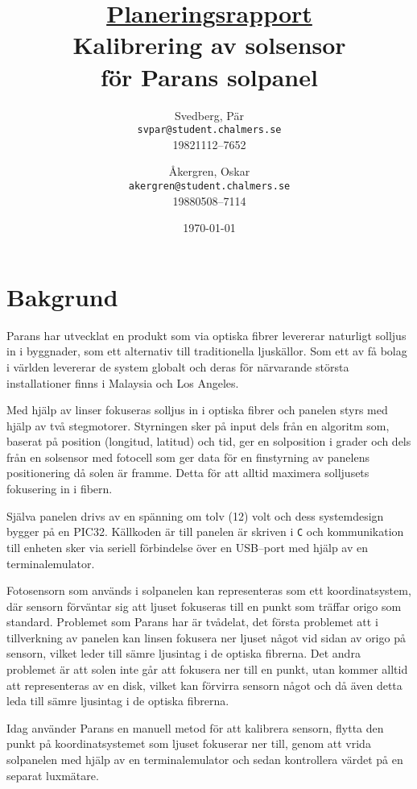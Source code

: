 \documentclass[a4paper, 12pt]{article}
\author{Svedberg, Pär\\ \texttt{svpar@student.chalmers.se}  \\ 
            19821112--7652 \and
            Åkergren, Oskar\\ \texttt{akergren@student.chalmers.se}  \\ 19880508--7114
}
\title{\underline{Planeringsrapport} \\ Kalibrering av solsensor \\ för Parans solpanel \vspace{1cm}}
\date{\vspace{8cm}\today}
\begin{document}
\maketitle
\thispagestyle{empty}

\newpage
\setcounter{page}{1}

\section{Bakgrund} %
\label{sec:bakgrund}

    Parans har utvecklat en produkt som via optiska fibrer levererar naturligt solljus in i byggnader, som ett alternativ till traditionella ljuskällor. Som ett av få bolag i världen levererar de system globalt och deras för närvarande största installationer finns i Malaysia och Los Angeles. \bigskip

    Med hjälp av linser fokuseras solljus in i optiska fibrer och panelen styrs med hjälp av två stegmotorer. Styrningen sker på input dels från en algoritm som, baserat på position (longitud, latitud) och tid, ger en solposition i grader och dels från en solsensor med fotocell som ger data för en finstyrning av panelens positionering då solen är framme.
    Detta för att alltid maximera solljusets fokusering in i fibern.\bigskip

    Själva panelen drivs av en spänning om tolv (12) volt och dess systemdesign bygger på en PIC32. Källkoden är till panelen är skriven i \texttt{C} och kommunikation till enheten sker via seriell förbindelse över en USB–port med hjälp av en terminalemulator. \bigskip

    Fotosensorn som används i solpanelen kan representeras som ett koordinatsystem, där sensorn förväntar sig att ljuset fokuseras till en punkt som träffar origo som standard. Problemet som Parans har är tvådelat, det första problemet att i tillverkning av panelen kan linsen fokusera ner ljuset något vid sidan av origo på sensorn, vilket leder till sämre ljusintag i de optiska fibrerna. Det andra problemet är att solen inte går att fokusera ner till en punkt, utan kommer alltid att representeras av en disk, vilket kan förvirra sensorn något och då även detta leda till sämre ljusintag i de optiska fibrerna. \bigskip

    Idag använder Parans en manuell metod för att kalibrera sensorn, flytta den punkt på koordinatsystemet som ljuset fokuserar ner till, genom att vrida solpanelen med hjälp av en terminalemulator och sedan kontrollera värdet på en separat luxmätare.
\end{document}
